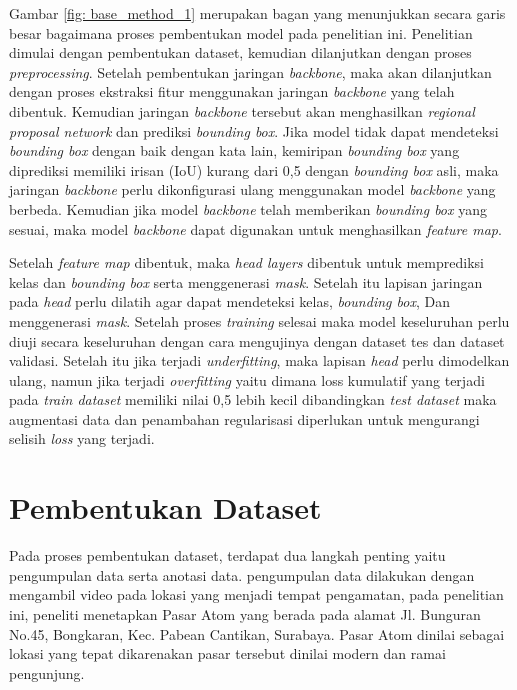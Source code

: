   Gambar \ref{fig: base_method_1} merupakan bagan yang menunjukkan secara garis besar bagaimana proses pembentukan model
  pada penelitian ini. Penelitian dimulai dengan pembentukan dataset, kemudian dilanjutkan dengan proses \textit{preprocessing}.
  Setelah pembentukan jaringan \textit{backbone}, maka akan dilanjutkan dengan proses ekstraksi fitur menggunakan jaringan
  \textit{backbone} yang telah dibentuk. Kemudian jaringan \textit{backbone} tersebut akan menghasilkan \textit{regional proposal network}
  dan prediksi \textit{bounding box}. Jika model tidak dapat mendeteksi \textit{bounding box} dengan baik dengan kata lain,
  kemiripan \textit{bounding box} yang diprediksi memiliki irisan (IoU) kurang dari 0,5 dengan \textit{bounding box} asli, maka
  jaringan \textit{backbone} perlu dikonfigurasi ulang menggunakan model \textit{backbone} yang berbeda. Kemudian jika model
  \textit{backbone} telah memberikan \textit{bounding box} yang sesuai, maka model \textit{backbone} dapat digunakan untuk
  menghasilkan \textit{feature map}.

  Setelah \textit{feature map} dibentuk, maka \textit{head layers} dibentuk untuk memprediksi kelas dan \textit{bounding box} serta 
  menggenerasi \textit{mask}. Setelah itu lapisan jaringan pada \textit{head} perlu dilatih agar dapat mendeteksi kelas, \textit{bounding box}, Dan
  menggenerasi \textit{mask}. Setelah proses \textit{training} selesai maka model keseluruhan perlu diuji secara keseluruhan dengan
  cara mengujinya dengan dataset tes dan dataset validasi. Setelah itu jika terjadi \textit{underfitting}, maka lapisan \textit{head} perlu
  dimodelkan ulang, namun jika terjadi \textit{overfitting} yaitu dimana loss kumulatif yang terjadi pada \textit{train dataset} memiliki
  nilai 0,5 lebih kecil dibandingkan \textit{test dataset} maka augmentasi data dan penambahan regularisasi diperlukan untuk
  mengurangi selisih \textit{loss} yang terjadi.

  \section{Pembentukan Dataset}
  Pada proses pembentukan dataset, terdapat dua langkah penting yaitu pengumpulan data serta anotasi data. pengumpulan
  data dilakukan dengan mengambil video pada lokasi yang menjadi tempat pengamatan, pada penelitian ini, peneliti 
  menetapkan Pasar Atom yang berada pada alamat Jl. Bunguran No.45, Bongkaran, Kec. Pabean Cantikan, Surabaya. 
  Pasar Atom dinilai sebagai lokasi yang tepat dikarenakan pasar tersebut dinilai modern dan ramai pengunjung.

